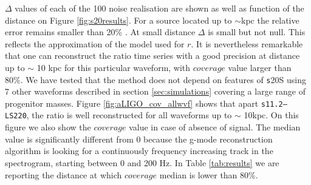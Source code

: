 $\Delta$ values of each of the 100 noise realisation are shown as well as function of the distance
on Figure \ref{fig:s20results}. For a source located up to $\sim$\unit[10]{kpc} the relative error
remains smaller than 20\% . At small distance $\Delta$ is small but not null. This reflects the
approximation of the model used for $r$.
It is nevertheless remarkable that one can reconstruct the ratio time series with a good
precision at distance up to $\sim$ 10 kpc for this particular waveform, with $coverage$ value
larger than 80\%.
We have tested that the method does not depend on features of {\texttt s20S} using  7 other waveforms 
described in section \ref{sec:simulations} covering a large range of progenitor masses.
Figure \ref{fig:aLIGO_cov_allwvf} shows that apart {\tt s11.2--LS220}, the ratio is well
reconstructed for all waveforms up to $\sim$ 10kpc. On this figure we also show the $coverage$
value in case of absence of signal. The median value is significantly different from 0 because
the g-mode reconstruction algorithm is looking for a continuously frequency increasing track
in the spectrogram, starting between 0 and 200 Hz. In Table \ref{tab:results} we are reporting the
distance at which $coverage$ median is lower than 80\%. 



